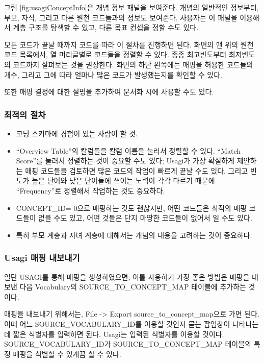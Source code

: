 \documentclass[11pt]{book}
\providecommand{\tightlist}{%
  \setlength{\itemsep}{0pt}\setlength{\parskip}{0pt}}
\theoremstyle{definition}
\theoremstyle{definition}
\theoremstyle{definition}
\theoremstyle{remark}
\begin{document}
그림 \ref{fig:usagiConceptInfo}은 개념 정보 패널을 보여준다. 개념의
일반적인 정보부터, 부모, 자식, 그리고 다른 원천 코드들과의 정보도
보여준다. 사용자는 이 패널을 이용해서 계층 구조를 탐색할 수 있고, 다른
목표 컨셉을 정할 수도 있다.

모든 코드가 끝날 때까지 코드를 따라 이 절차를 진행하면 된다. 화면의 맨
위의 원천 코드 목록에서, 열 머리글별로 코드들을 정렬할 수 있다. 종종
최고빈도부터 최저빈도의 코드까지 살펴보는 것을 권장한다. 화면의 하단
왼쪽에는 매핑을 허용한 코드들의 개수, 그리고 그에 따라 얼마나 많은
코드가 발생했는지를 확인할 수 있다.

또한 매핑 결정에 대한 설명을 추가하여 문서화 시에 사용할 수도 있다.

\subsubsection*{최적의 절차}\label{-}

\begin{itemize}
\tightlist
\item
  코딩 스키마에 경험이 있는 사람이 할 것.
\item
  ``Overview Table''의 칼럼들을 칼럼 이름을 눌러서 정렬할 수 있다.
  ``Match Score''를 눌러서 정렬하는 것이 중요할 수도 있다; Usagi가 가장
  확실하게 제안하는 매핑 코드들을 검토하면 많은 코드의 작업이 빠르게
  끝날 수도 있다. 그리고 빈도가 높은 단어와 낮은 단어들에 쓰이는 노력이
  각각 다르기 때문에 ``Frequency''로 정렬해서 작업하는 것도 중요하다.
\item
  CONCEPT\_ID= 0으로 매핑하는 것도 괜찮지만, 어떤 코드들은 최적의 매핑
  코드들이 없을 수도 있고, 어떤 것들은 단지 마땅한 코드들이 없어서 일
  수도 있다.
\item
  특히 부모 계층과 자녀 계층에 대해서는 개념의 내용을 고려하는 것이
  중요하다.
\end{itemize}

\subsubsection*{Usagi 매핑 내보내기}\label{usagi--}

일단 USAGI를 통해 매핑을 생성하였으면, 이를 사용하기 가장 좋은 방법은
매핑을 내보낸 다음 Vocabulary의 SOURCE\_TO\_CONCEPT\_MAP 테이블에
추가하는 것이다.

매핑을 내보내기 위해서는, File -\textgreater{} Export
source\_to\_concept\_map으로 가면 된다. 이때 어느
SOURCE\_VOCABULARY\_ID를 이용할 것인지 묻는 팝업창이 나타나는데 짧은
식별자를 입력하면 된다. Usagi는 입력된 식별자를 이용할 것이다.
SOURCE\_VOCABULARY\_ID가 SOURCE\_TO\_CONCEPT\_MAP 테이블의 특정 매핑을
식별할 수 있게끔 할 수 있다.
\end{document}
